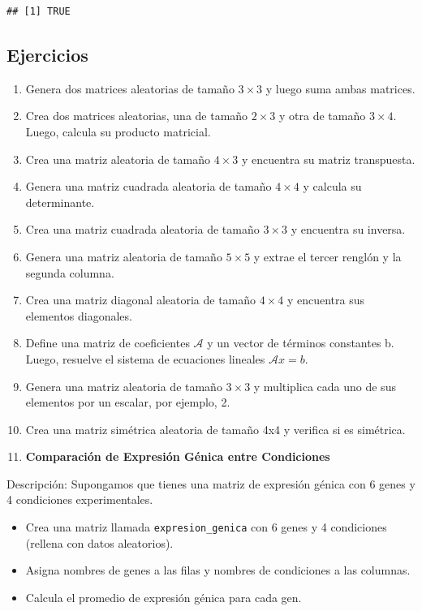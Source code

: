 \documentclass[
]{book}
\providecommand{\tightlist}{%
  \setlength{\itemsep}{0pt}\setlength{\parskip}{0pt}}
\begin{document}
\begin{verbatim}
## [1] TRUE
\end{verbatim}

\subsection{Ejercicios}\label{ejercicios}

\begin{enumerate}
\def\labelenumi{\arabic{enumi}.}
\item
  Genera dos matrices aleatorias de tamaño \(3 \times 3\) y luego suma ambas matrices.
\item
  Crea dos matrices aleatorias, una de tamaño \(2\times 3\) y otra de tamaño \(3 \times 4\). Luego, calcula su producto matricial.
\item
  Crea una matriz aleatoria de tamaño \(4\times 3\) y encuentra su matriz transpuesta.
\item
  Genera una matriz cuadrada aleatoria de tamaño \(4\times 4\) y calcula su determinante.
\item
  Crea una matriz cuadrada aleatoria de tamaño \(3\times 3\) y encuentra su inversa.
\item
  Genera una matriz aleatoria de tamaño \(5 \times 5\) y extrae el tercer renglón y la segunda columna.
\item
  Crea una matriz diagonal aleatoria de tamaño \(4 \times 4\) y encuentra sus elementos diagonales.
\item
  Define una matriz de coeficientes \(\mathcal A\) y un vector de términos constantes b. Luego, resuelve el sistema de ecuaciones lineales \(\mathcal Ax = b\).
\item
  Genera una matriz aleatoria de tamaño \(3\times 3\) y multiplica cada uno de sus elementos por un escalar, por ejemplo, 2.
\item
  Crea una matriz simétrica aleatoria de tamaño 4x4 y verifica si es simétrica.
\item
  \textbf{Comparación de Expresión Génica entre Condiciones}
\end{enumerate}

Descripción: Supongamos que tienes una matriz de expresión génica con 6 genes y 4 condiciones experimentales.

\begin{itemize}
\tightlist
\item
  Crea una matriz llamada \texttt{expresion\_genica} con 6 genes y 4 condiciones (rellena con datos aleatorios).
\item
  Asigna nombres de genes a las filas y nombres de condiciones a las columnas.
\item
  Calcula el promedio de expresión génica para cada gen.
\end{itemize}
\end{document}
